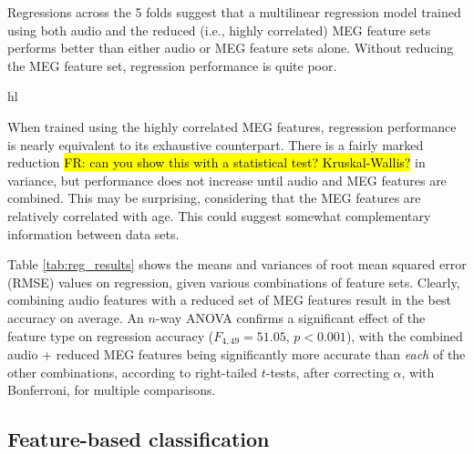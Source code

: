 \documentclass[utf8]{frontiersSCNS} %
\newcommand{\FR}[1]{{\small \textcolor{red}{\hl{FR: #1}}}}
\begin{document}
Regressions across the 5 folds suggest that a multilinear regression model trained using both audio and the reduced (i.e., highly correlated) MEG feature sets performs better than either audio or MEG feature sets alone. Without reducing the MEG feature set, regression performance is quite poor.

hl{When trained using the highly correlated MEG features, regression performance is nearly equivalent to its exhaustive counterpart. There is a fairly marked reduction \FR{can you show this with a statistical test? Kruskal-Wallis?} in variance, but performance does not increase until audio and MEG features are combined. This may be surprising, considering that the MEG features are relatively correlated with age. This could suggest somewhat complementary information between data sets. %

Table \ref{tab:reg_results} shows the means and variances of root mean squared error (RMSE) values on regression, given various combinations of feature sets. Clearly, combining audio features with a reduced set of MEG features result in the best accuracy on average. An $n$-way ANOVA confirms a significant effect of the feature type on regression accuracy ($F_{4,49} = 51.05$, $p<0.001$), with the combined audio + reduced MEG features being significantly more accurate than {\em each} of the other combinations, according to right-tailed $t$-tests, after correcting $\alpha$, with Bonferroni, for multiple comparisons.}

\subsection{Feature-based classification}
\end{document}
